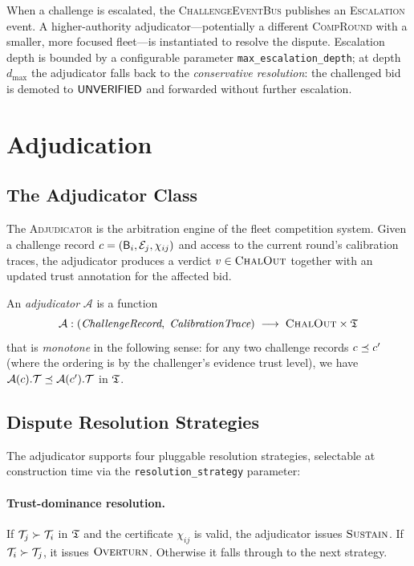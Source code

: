 \documentclass[11pt]{article}
\providecommand{\Bid}{\mathsf{B}}                 %
\providecommand{\Adj}{\mathcal{A}}                %
\providecommand{\CompRound}{\textsc{CompRound}}   %
\providecommand{\ChalOut}{\textsc{ChalOut}}       %
\providecommand{\SUSTAIN}{\textsc{Sustain}}
\providecommand{\OVERTURN}{\textsc{Overturn}}
\begin{document}
When a challenge is escalated, the \textsc{ChallengeEventBus} publishes an
\textsc{Escalation} event.  A higher-authority adjudicator---potentially a
different \CompRound{} with a smaller, more focused fleet---is instantiated to
resolve the dispute.  Escalation depth is bounded by a configurable parameter
\texttt{max\_escalation\_depth}; at depth $d_{\max}$ the adjudicator falls
back to the \emph{conservative resolution}: the challenged bid is demoted to
$\mathsf{UNVERIFIED}$ and forwarded without further escalation.

\section{Adjudication}\label{sec:adjudication}

\subsection{The Adjudicator Class}

The \textsc{Adjudicator} is the arbitration engine of the fleet competition
system.  Given a challenge record $c = (\Bid_i, \evid_j, \chi_{ij})$ and
access to the current round's calibration traces, the adjudicator produces a
verdict $v \in \ChalOut{}$ together with an updated trust annotation for the
affected bid.

\begin{definition}[Adjudicator]\label{def:adjudicator}
An \emph{adjudicator} $\Adj$ is a function
\[
  \Adj : (\textit{ChallengeRecord},\; \textit{CalibrationTrace})
         \;\longrightarrow\; \ChalOut{} \times \Talg
\]
that is \emph{monotone} in the following sense: for any two challenge records
$c \preceq c'$ (where the ordering is by the challenger's evidence trust level),
we have $\Adj(c).{\trust} \tleq \Adj(c').{\trust}$ in $\mathfrak{T}$.
\end{definition}

\subsection{Dispute Resolution Strategies}

The adjudicator supports four pluggable resolution strategies, selectable at
construction time via the \texttt{resolution\_strategy} parameter:

\paragraph{Trust-dominance resolution.}
If $\mathcal{T}_j \succ \mathcal{T}_i$ in $\mathfrak{T}$ and the certificate $\chi_{ij}$ is
valid, the adjudicator issues $\SUSTAIN$.  If $\mathcal{T}_i \succ \mathcal{T}_j$, it
issues $\OVERTURN$.  Otherwise it falls through to the next strategy.
\end{document}
